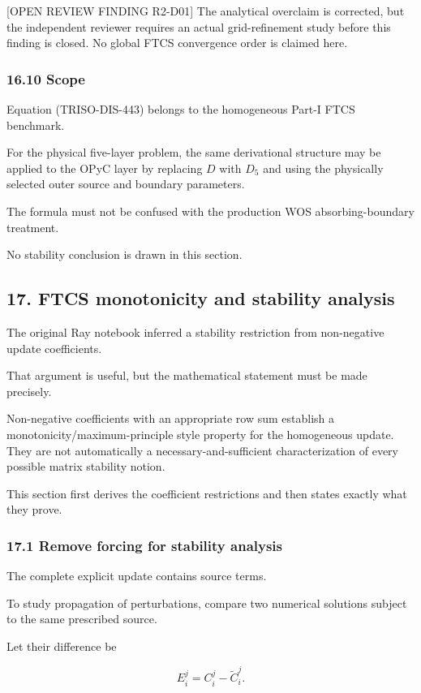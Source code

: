 \documentclass[11pt,a4paper]{article}
\begin{document}
[OPEN REVIEW FINDING R2-D01] The analytical overclaim is corrected, but the independent reviewer requires an actual grid-refinement study before this finding is closed. No global FTCS convergence order is claimed here.

\subsubsection*{16.10 Scope}

Equation (TRISO-DIS-443) belongs to the homogeneous Part-I FTCS benchmark.

For the physical five-layer problem, the same derivational structure may be applied to the OPyC layer by replacing $D$ with $D_5$ and using the physically selected outer source and boundary parameters.

The formula must not be confused with the production WOS absorbing-boundary treatment.

No stability conclusion is drawn in this section.

\subsection*{17. FTCS monotonicity and stability analysis}

The original Ray notebook inferred a stability restriction from non-negative update coefficients.

That argument is useful, but the mathematical statement must be made precisely.

Non-negative coefficients with an appropriate row sum establish a monotonicity/maximum-principle style property for the homogeneous update. They are not automatically a necessary-and-sufficient characterization of every possible matrix stability notion.

This section first derives the coefficient restrictions and then states exactly what they prove.

\subsubsection*{17.1 Remove forcing for stability analysis}

The complete explicit update contains source terms.

To study propagation of perturbations, compare two numerical solutions subject to the same prescribed source.

Let their difference be

\begin{equation}
E_i^j
=
C_i^j-\widetilde C_i^j.
\tag{TRISO-DIS-500}
\label{eq:triso-dis-500}
\end{equation}
\end{document}

